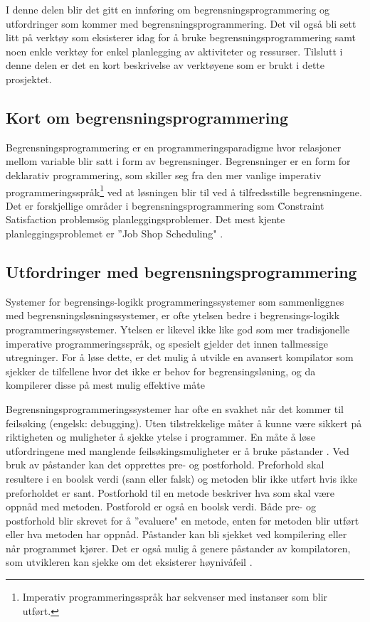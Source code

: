 I denne delen blir det gitt en innføring om begrensningsprogrammering og utfordringer som kommer med begrensningsprogrammering. Det vil også bli sett litt på verktøy som eksisterer idag for å bruke begrensningsprogrammering samt noen enkle verktøy for enkel planlegging av aktiviteter og ressurser. Tilslutt i denne delen er det en kort beskrivelse av verktøyene som er brukt i dette prosjektet.

\subsection{Kort om begrensningsprogrammering}
Begrensningsprogrammering er en programmeringsparadigme hvor relasjoner mellom variable blir satt i form av begrensninger. Begrensninger er en form for deklarativ programmering, som skiller seg fra den mer vanlige imperativ programmeringsspråk\footnote{Imperativ programmeringsspråk har sekvenser med instanser som blir utført.} ved at løsningen blir til ved å tilfredsstille begrensningene. Det er forskjellige områder i begrensningsprogrammering som \"Constraint Satisfaction problems\" og planleggingsproblemer. Det mest kjente planleggingsproblemet er ''Job Shop Scheduling" \cite{cpwikipedia}.

\subsection{Utfordringer med begrensningsprogrammering}
Systemer for begrensings-logikk programmeringssystemer som sammenliggnes med begrensningsløsningssystemer, er ofte ytelsen bedre i begrensings-logikk programmeringssystemer. Ytelsen er likevel ikke like god som mer tradisjonelle imperative programmeringsspråk, og spesielt gjelder det innen tallmessige utregninger. For å løse dette, er det mulig å utvikle en avansert kompilator som sjekker de tilfellene hvor det ikke er behov for begrensingsløning, og da kompilerer disse på mest mulig effektive måte \cite{challengesManuel}

Begrensningsprogrammeringssystemer har ofte en svakhet når det kommer til feilsøking (engelsk: debugging). Uten tilstrekkelige måter å kunne være sikkert på riktigheten og muligheter å sjekke ytelse i programmer. En måte å løse utfordringene med manglende feilsøkingsmuligheter er å bruke påstander . Ved bruk av påstander kan det opprettes pre- og postforhold. Preforhold skal resultere i en boolsk verdi (sann eller falsk) og metoden blir ikke utført hvis ikke preforholdet er sant. Postforhold til en metode beskriver hva som skal være oppnåd med metoden. Postforold er også en boolsk verdi. Både pre- og postforhold blir skrevet for å ''evaluere" en metode, enten før metoden blir utført eller hva metoden har oppnåd. Påstander kan bli sjekket ved kompilering eller når programmet kjører. Det er også mulig å genere påstander av kompilatoren, som utvikleren kan sjekke om det eksisterer høynivåfeil \cite{challengesManuel}.

